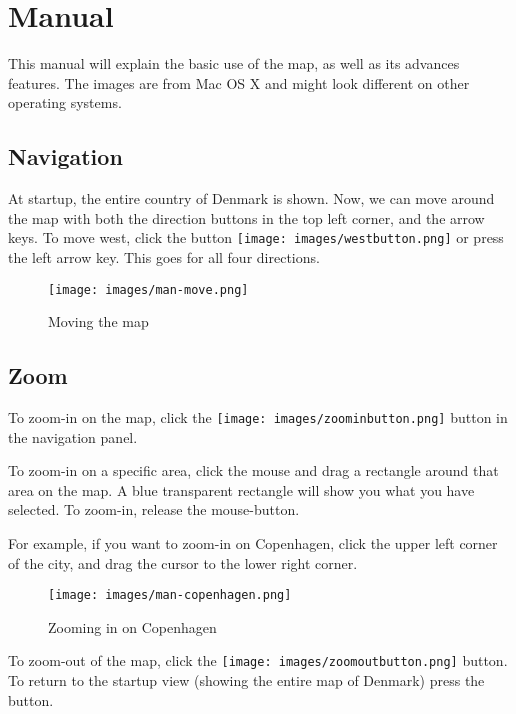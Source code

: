 \chapter{Manual}
\label{MAN}

This manual will explain the basic use of the map, as well as its
advances features. The images are from Mac OS X and might look different on other
operating systems.

\section{Navigation}
\label{MAN-N}
At startup, the entire country of Denmark is shown. Now, we can move around the
map with both the direction buttons in the top left corner, and the arrow keys.
To move west, click the button
\texttt{[image: images/westbutton.png]} or press the left arrow
key. This goes for all four directions.

\begin{figure}[h!]
\centering
\texttt{[image: images/man-move.png]}
\caption{Moving the map}
\label{MAN-Z-COP}
\end{figure}

\section{Zoom}
\label{MAN-Z}
To zoom-in on the map, click the
\texttt{[image: images/zoominbutton.png]} button in the navigation
panel.

To zoom-in on a specific area, click the mouse and drag a rectangle around that
area on the map. A blue transparent rectangle will show you what you have
selected. To zoom-in, release the mouse-button.

For example, if you want to zoom-in on Copenhagen,
click the upper left corner of the city, and drag the cursor to the lower right
corner.

\begin{figure}[h!]
\centering
\texttt{[image: images/man-copenhagen.png]}
\caption{Zooming in on Copenhagen}
\label{MAN-Z-COP}
\end{figure}

To zoom-out of the map, click the
\texttt{[image: images/zoomoutbutton.png]} button. To return to
the startup view (showing the entire map of Denmark) press the  button.

